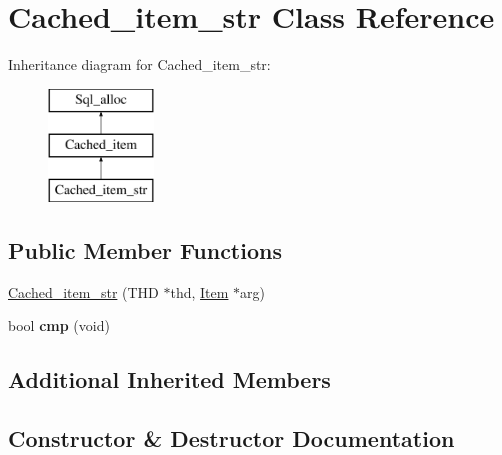 \hypertarget{classCached__item__str}{}\section{Cached\+\_\+item\+\_\+str Class Reference}
\label{classCached__item__str}
Inheritance diagram for Cached\+\_\+item\+\_\+str\+:\begin{figure}[H]
\begin{center}
\leavevmode
\includegraphics[height=3.000000cm]{classCached__item__str}
\end{center}
\end{figure}
\subsection*{Public Member Functions}
\begin{DoxyCompactItemize}
\item 
\mbox{\hyperlink{classCached__item__str_a53efe6b37689a57c683183658d19578d}{Cached\+\_\+item\+\_\+str}} (T\+HD $\ast$thd, \mbox{\hyperlink{classItem}{Item}} $\ast$arg)
\item 
\mbox{\label{classCached__item__str_aa2c6bdfa162d6b9c64fca014ab5bfc6f}} 
bool {\bfseries cmp} (void)
\end{DoxyCompactItemize}
\subsection*{Additional Inherited Members}


\subsection{Constructor \& Destructor Documentation}
\mbox{\label{classCached__item__str_a53efe6b37689a57c683183658d19578d}} 

